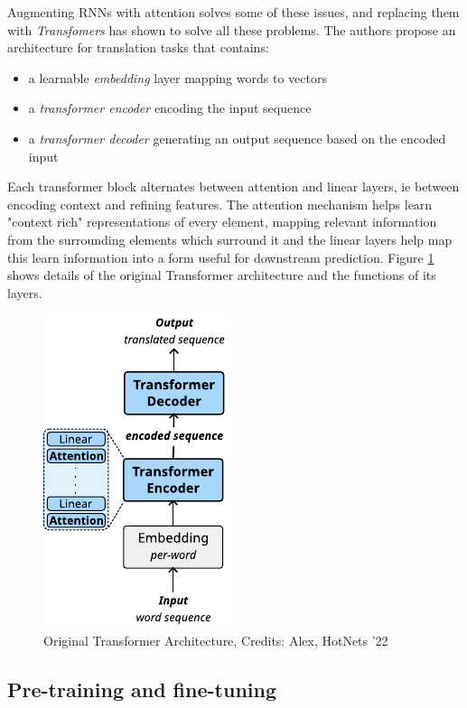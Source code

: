 Augmenting RNNs with attention solves some of these issues\cite{rnnattention},  and replacing them with \emph{Transfomers} has shown to solve all these problems.
The authors propose an architecture for translation tasks that contains:
\begin{itemize}
\item a learnable \emph{embedding} layer mapping words to vectors
\item a \emph{transformer encoder} encoding the input sequence
\item a \emph{transformer decoder} generating an output sequence based on the encoded input
\end{itemize}

Each transformer block alternates between attention and linear layers, ie between encoding context and refining features. The attention mechanism helps learn "context rich" representations of every element, mapping relevant information from the surrounding elements which surround it and the linear layers help map this learn information into a form useful for downstream prediction. Figure \ref{fig:transformer} shows details of the original Transformer architecture and the functions of its layers.

\begin{figure}[!hbt]
  \begin{center}
    \includegraphics[scale=1.5]{figures/architecture_transformer.pdf}
    \caption{Original Transformer Architecture, Credits: Alex, HotNets '22}
    \label{fig:transformer}
  \end{center}
\end{figure}

\subsection{Pre-training and fine-tuning}
\label{ssec:bgtraining}

